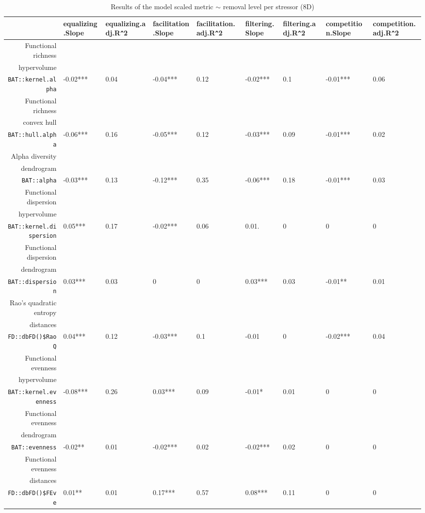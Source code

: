 \begin{table}[ht]
\centering
\scriptsize
\begin{tabular}{rllllllll}
  \hline
 & equalizing.Slope & equalizing.adj.R\verb|^|2 & facilitation.Slope & facilitation.adj.R\verb|^|2 & filtering.Slope & filtering.adj.R\verb|^|2 & competition.Slope & competition.adj.R\verb|^|2 \\ 
  \hline
  Functional richness\\ hypervolume\\ \texttt{BAT::kernel.alpha} & -0.02*** & 0.04 & -0.04*** & 0.12 & -0.02*** & 0.1 & -0.01*** & 0.06 \\ 
  Functional richness\\ convex hull\\ \texttt{BAT::hull.alpha} & -0.06*** & 0.16 & -0.05*** & 0.12 & -0.03*** & 0.09 & -0.01*** & 0.02 \\ 
  Alpha diversity\\ dendrogram\\ \texttt{BAT::alpha} & -0.03*** & 0.13 & -0.12*** & 0.35 & -0.06*** & 0.18 & -0.01*** & 0.03 \\ 
  Functional dispersion\\ hypervolume\\ \texttt{BAT::kernel.dispersion} & 0.05*** & 0.17 & -0.02*** & 0.06 & 0.01. & 0 & 0 & 0 \\ 
  Functional dispersion\\ dendrogram\\ \texttt{BAT::dispersion} & 0.03*** & 0.03 & 0 & 0 & 0.03*** & 0.03 & -0.01** & 0.01 \\ 
  Rao's quadratic entropy\\ distances\\ \texttt{FD::dbFD()\$RaoQ} & 0.04*** & 0.12 & -0.03*** & 0.1 & -0.01 & 0 & -0.02*** & 0.04 \\ 
  Functional evenness\\ hypervolume\\ \texttt{BAT::kernel.evenness} & -0.08*** & 0.26 & 0.03*** & 0.09 & -0.01* & 0.01 & 0 & 0 \\ 
  Functional evenness\\ dendrogram\\ \texttt{BAT::evenness} & -0.02** & 0.01 & -0.02*** & 0.02 & -0.02*** & 0.02 & 0 & 0 \\ 
  Functional evenness\\ distances\\ \texttt{FD::dbFD()\$FEve} & 0.01** & 0.01 & 0.17*** & 0.57 & 0.08*** & 0.11 & 0 & 0 \\ 
   \hline
\end{tabular}
\caption{Results of the model scaled metric $\sim$ removal level per stressor (8D)} 
\end{table}

